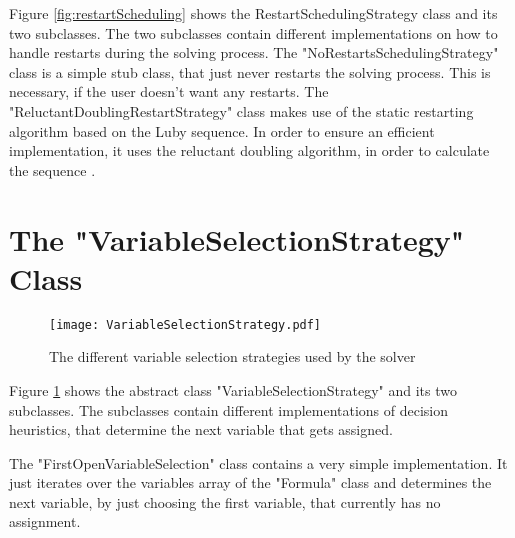 Figure \ref{fig:restartScheduling} shows the RestartSchedulingStrategy class and its two subclasses. The two subclasses contain different implementations on how to handle restarts during the solving process. The "NoRestartsSchedulingStrategy" class is a simple stub class, that just never restarts the solving process. This is necessary, if the user doesn't want any restarts. The "ReluctantDoublingRestartStrategy" class makes use of the static restarting algorithm based on the Luby sequence. In order to ensure an efficient implementation, it uses the reluctant doubling algorithm, in order to calculate the sequence \cite{PAAR-2012:Practical_Aspects_of_SAT, biere_practical_nodate}.

\section{The "VariableSelectionStrategy" Class}

\begin{figure}[htbp]
  \centering
  \texttt{[image: VariableSelectionStrategy.pdf]}
  \caption{The different variable selection strategies used by the solver}
  \label{fig:variableSelection}
\end{figure}

Figure \ref{fig:variableSelection} shows the abstract class "VariableSelectionStrategy" and its two subclasses. The subclasses contain different implementations of decision heuristics, that determine the next variable that gets assigned.

The "FirstOpenVariableSelection" class contains a very simple implementation. It just iterates over the variables array of the "Formula" class and determines the next variable, by just choosing the first variable, that currently has no assignment.

